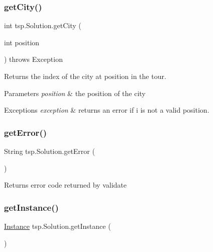 \subsubsection{\texorpdfstring{get\+City()}{getCity()}}
{\footnotesize\ttfamily int tsp.\+Solution.\+get\+City (\begin{DoxyParamCaption}\item[{int}]{position }\end{DoxyParamCaption}) throws Exception\hspace{0.3cm}{\ttfamily [inline]}}

Returns the index of the city at position in the tour. 
\begin{DoxyParams}{Parameters}
{\em position} & the position of the city \\
\hline
\end{DoxyParams}

\begin{DoxyExceptions}{Exceptions}
{\em exception} & returns an error if i is not a valid position. \\
\hline
\end{DoxyExceptions}
\mbox{\label{classtsp_1_1_solution_acd7f1ed6324f49a3b539905cd15c34bf}} 
\subsubsection{\texorpdfstring{get\+Error()}{getError()}}
{\footnotesize\ttfamily String tsp.\+Solution.\+get\+Error (\begin{DoxyParamCaption}{ }\end{DoxyParamCaption})\hspace{0.3cm}{\ttfamily [inline]}}

\begin{DoxyReturn}{Returns}
error code returned by {\ttfamily validate} 
\end{DoxyReturn}
\mbox{\label{classtsp_1_1_solution_adfcfa57062ec8aaba3b71de852788bb1}} 
\subsubsection{\texorpdfstring{get\+Instance()}{getInstance()}}
{\footnotesize\ttfamily \mbox{\hyperlink{classtsp_1_1_instance}{Instance}} tsp.\+Solution.\+get\+Instance (\begin{DoxyParamCaption}{ }\end{DoxyParamCaption})\hspace{0.3cm}{\ttfamily [inline]}}

